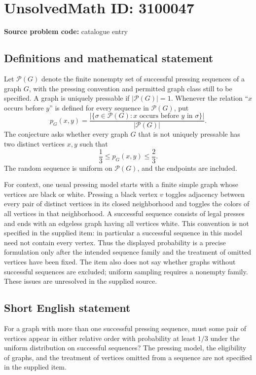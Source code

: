 \documentclass[11pt]{article}
\begin{document}
\section*{UnsolvedMath ID: 3100047}
\textbf{Source problem code:} catalogue entry
\subsection{Definitions and mathematical statement}
Let $\mathcal P(G)$ denote the finite nonempty set of successful pressing sequences of a graph $G$, with the pressing convention and permitted graph class still to be specified. A graph is uniquely pressable if $|\mathcal P(G)|=1$. Whenever the relation ``$x$ occurs before $y$'' is defined for every sequence in $\mathcal P(G)$, put
\[
p_G(x,y)=\frac{|\{\sigma\in\mathcal P(G):x\text{ occurs before }y\text{ in }\sigma\}|}{|\mathcal P(G)|}.
\]
The conjecture asks whether every graph $G$ that is not uniquely pressable has two distinct vertices $x,y$ such that
\[
\frac13\leq p_G(x,y)\leq\frac23.
\]
The random sequence is uniform on $\mathcal P(G)$, and the endpoints are included.

For context, one usual pressing model starts with a finite simple graph whose vertices are black or white. Pressing a black vertex $v$ toggles adjacency between every pair of distinct vertices in its closed neighborhood and toggles the colors of all vertices in that neighborhood. A successful sequence consists of legal presses and ends with an edgeless graph having all vertices white. This convention is not specified in the supplied item: in particular a successful sequence in this model need not contain every vertex. Thus the displayed probability is a precise formulation only after the intended sequence family and the treatment of omitted vertices have been fixed. The item also does not say whether graphs without successful sequences are excluded; uniform sampling requires a nonempty family. These issues are unresolved in the supplied source.
\subsection{Short English statement}
For a graph with more than one successful pressing sequence, must some pair of vertices appear in either relative order with probability at least $1/3$ under the uniform distribution on successful sequences? The pressing model, the eligibility of graphs, and the treatment of vertices omitted from a sequence are not specified in the supplied item.
\end{document}
